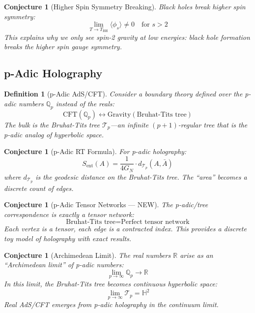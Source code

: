\documentclass[12pt,a4paper]{article}
\newtheorem{conjecture}[theorem]{Conjecture}
\newtheorem{definition}[theorem]{Definition}
\begin{document}
\begin{conjecture}[Higher Spin Symmetry Breaking]
Black holes break higher spin symmetry:
\begin{equation}
\lim_{T \to T_{\text{BH}}} \langle \phi_s \rangle \neq 0 \quad \text{for } s > 2
\end{equation}
This explains why we only see spin-2 gravity at low energies: black hole formation breaks the higher spin gauge symmetry.
\end{conjecture}

\subsection{p-Adic Holography}

\begin{definition}[p-Adic AdS/CFT]
Consider a boundary theory defined over the p-adic numbers $\mathbb{Q}_p$ instead of the reals:
\begin{equation}
\text{CFT}(\mathbb{Q}_p) \longleftrightarrow \text{Gravity}(\text{Bruhat-Tits tree})
\end{equation}
The bulk is the Bruhat-Tits tree $\mathcal{T}_p$---an infinite $(p+1)$-regular tree that is the p-adic analog of hyperbolic space.
\end{definition}

\begin{conjecture}[p-Adic RT Formula]
For p-adic holography:
\begin{equation}
S_{\text{ent}}(A) = \frac{1}{4G_N} \cdot d_{\mathcal{T}_p}(A, \bar{A})
\end{equation}
where $d_{\mathcal{T}_p}$ is the geodesic distance on the Bruhat-Tits tree. The ``area'' becomes a discrete count of edges.
\end{conjecture}

\begin{conjecture}[p-Adic Tensor Networks --- NEW]
The p-adic/tree correspondence is \textit{exactly} a tensor network:
\begin{equation}
\text{Bruhat-Tits tree} = \text{Perfect tensor network}
\end{equation}
Each vertex is a tensor, each edge is a contracted index. This provides a discrete toy model of holography with exact results.
\end{conjecture}

\begin{conjecture}[Archimedean Limit]
The real numbers $\mathbb{R}$ arise as an ``Archimedean limit'' of p-adic numbers:
\begin{equation}
\lim_{p \to \infty} \mathbb{Q}_p \to \mathbb{R}
\end{equation}
In this limit, the Bruhat-Tits tree becomes continuous hyperbolic space:
\begin{equation}
\lim_{p \to \infty} \mathcal{T}_p = \mathbb{H}^2
\end{equation}
Real AdS/CFT emerges from p-adic holography in the continuum limit.
\end{conjecture}
\end{document}
